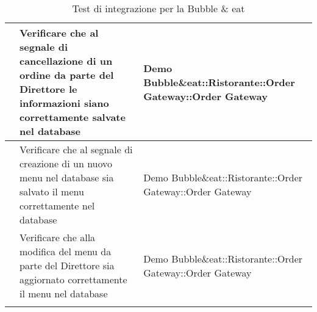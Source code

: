 \begin{longtable}{|c|P{7cm}|P{5cm}|}
	\hline {} & Verificare che al segnale di cancellazione di un ordine da parte del Direttore le informazioni siano correttamente salvate nel database & Demo Bubble\&eat::Ristorante::Order Gateway::Order Gateway  \\
	\hline {} & Verificare che al segnale di creazione di un nuovo menu nel database sia salvato il menu correttamente nel database & Demo Bubble\&eat::Ristorante::Order Gateway::Order Gateway  \\
	\hline {} & Verificare che alla modifica del menu da parte del Direttore sia aggiornato correttamente il menu nel database & Demo Bubble\&eat::Ristorante::Order Gateway::Order Gateway  \\
	\hline
	\caption{Test di integrazione per la Bubble \& eat}
\end{longtable}
